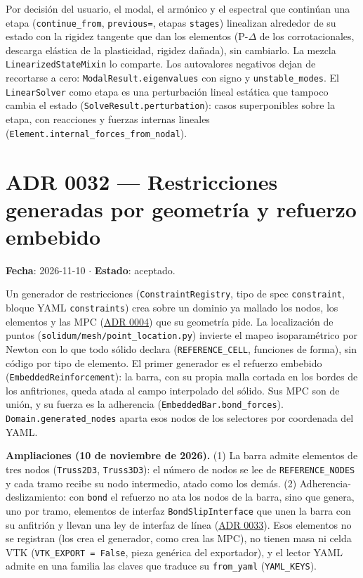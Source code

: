 \documentclass[11pt,oneside]{report}
\begin{document}
Por decisión del usuario, el modal, el armónico y el espectral que continúan una etapa (\texttt{continue\_from}, \texttt{previous=}, etapas \texttt{stages}) linealizan alrededor de su estado con la rigidez tangente que dan los elementos (P-\ensuremath{\Delta} de los corrotacionales, descarga elástica de la plasticidad, rigidez dañada), sin cambiarlo. La mezcla \texttt{LinearizedStateMixin} lo comparte. Los autovalores negativos dejan de recortarse a cero: \texttt{ModalResult.\allowbreak{}eigenvalues} con signo y \texttt{unstable\_modes}. El \texttt{LinearSolver} como etapa es una perturbación lineal estática que tampoco cambia el estado (\texttt{SolveResult.\allowbreak{}perturbation}): casos superponibles sobre la etapa, con reacciones y fuerzas internas lineales (\texttt{Element.\allowbreak{}internal\_\allowbreak{}forces\_\allowbreak{}from\_\allowbreak{}nodal}).

\section{ADR 0032 --- Restricciones generadas por geometría y refuerzo embebido}
\label{adr:0032}

\textbf{Fecha}: 2026-11-10 \ensuremath{\cdot} \textbf{Estado}: aceptado.

Un generador de restricciones (\texttt{ConstraintRegistry}, tipo de spec \texttt{constraint}, bloque YAML \texttt{constraints}) crea sobre un dominio ya mallado los nodos, los elementos y las MPC (\hyperref[adr:0004]{ADR 0004}) que su geometría pide. La localización de puntos (\texttt{solidum/\allowbreak{}mesh/\allowbreak{}point\_\allowbreak{}location.\allowbreak{}py}) invierte el mapeo isoparamétrico por Newton con lo que todo sólido declara (\texttt{REFERENCE\_CELL}, funciones de forma), sin código por tipo de elemento. El primer generador es el refuerzo embebido (\texttt{EmbeddedReinforcement}): la barra, con su propia malla cortada en los bordes de los anfitriones, queda atada al campo interpolado del sólido. Sus MPC son de unión, y su fuerza es la adherencia (\texttt{EmbeddedBar.\allowbreak{}bond\_\allowbreak{}forces}). \texttt{Domain.\allowbreak{}generated\_\allowbreak{}nodes} aparta esos nodos de los selectores por coordenada del YAML.

\textbf{Ampliaciones (10 de noviembre de 2026).} (1) La barra admite elementos de tres nodos (\texttt{Truss2D3}, \texttt{Truss3D3}): el número de nodos se lee de \texttt{REFERENCE\_NODES} y cada tramo recibe su nodo intermedio, atado como los demás. (2) Adherencia-deslizamiento: con \texttt{bond} el refuerzo no ata los nodos de la barra, sino que genera, uno por tramo, elementos de interfaz \texttt{BondSlipInterface} que unen la barra con su anfitrión y llevan una ley de interfaz de línea (\hyperref[adr:0033]{ADR 0033}). Esos elementos no se registran (los crea el generador, como crea las MPC), no tienen masa ni celda VTK (\texttt{VTK\_\allowbreak{}EXPORT = False}, pieza genérica del exportador), y el lector YAML admite en una familia las claves que traduce su \texttt{from\_yaml} (\texttt{YAML\_KEYS}).
\end{document}
